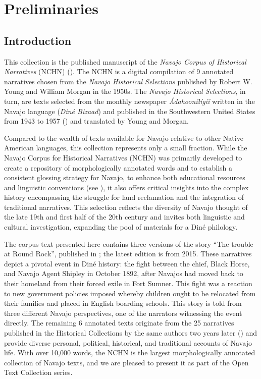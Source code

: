 \chapter{Preliminaries}\label{chapter:intro}
\section{Introduction}\label{sec:intro}

This collection is the published manuscript of the \textit{Navajo Corpus of Historical Narratives} (NCHN) (\cite{Denk:2025zp}). The NCHN is a digital compilation of 9 annotated narratives chosen from the \textit{Navajo Historical Selections} published by Robert W. Young and William Morgan in the 1950s. The \textit{Navajo Historical Selections}, in turn, are texts selected from the monthly newspaper \textit{Ádahooníłígíí} written in the Navajo language (\textit{Diné Bizaad}) and published in the Southwestern United States from 1943 to 1957 (\cite[51]{McCarty:2002bz}) and translated by Young and Morgan.

Compared to the wealth of texts available for Navajo relative to other Native American languages, this collection represents only a small fraction. While the Navajo Corpus for Historical Narratives (NCHN) was primarily developed to create a repository of morphologically annotated words and to establish a consistent glossing strategy for Navajo, to enhance both educational resources and linguistic conventions (see \cite{Denk:2024aq}), it also offers critical insights into the complex history encompassing the struggle for land reclamation and the integration of traditional narratives. This selection reflects the diversity of Navajo thought of the late 19th and first half of the 20th century and invites both linguistic and cultural investigation, expanding the pool of materials for a Diné philology.

The corpus text presented here contains three versions of the story ``The trouble at Round Rock'', published in \citet{Young:1952cy}; the latest edition is from 2015. These narratives depict a pivotal event in Diné history: the fight between the chief, Black Horse, and Navajo Agent Shipley in October 1892, after Navajos had moved back to their homeland from their forced exile in Fort Sumner. This fight was a reaction to new government policies imposed whereby children ought to be relocated from their families and placed in English boarding schools. This story is told from three different Navajo perspectives, one of the narrators witnessing the event directly. The remaining 6 annotated texts originate from the 25 narratives published in the Historical Collections by the same authors two years later (\cite{Young:1954jz}) and provide diverse personal, political, historical, and traditional accounts of Navajo life. With over 10,000 words, the NCHN is the largest morphologically annotated collection of Navajo texts, and we are pleased to present it as part of the Open Text Collection series.

